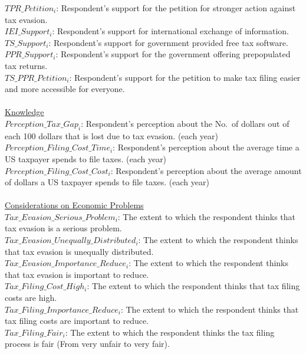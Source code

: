 \documentclass[11pt]{article}
\begin{document}
$TPR\_Petition_i$: Respondent's support for the petition for stronger action against tax evasion. \\[0.15em]
$IEI\_Support_i$: Respondent's support for international exchange of information. \\[0.15em]
$TS\_Support_i$:  Respondent's support for government provided free tax software. \\[0.15em]
$PPR\_Support_i$: Respondent's support for the government offering prepopulated tax returns. \\[0.15em]
$TS\_PPR\_Petition_i$: Respondent's support for the petition to make tax filing easier and more accessible for everyone.\\[0.15em]
\\[0.15em]
\underline{Knowledge} \\[0.15em]
$Perception\_Tax\_Gap_i$: Respondent's perception about the No.\ of dollars out of each 100 dollars that is lost due to tax evasion. (each year) \\[0.15em]
$Perception\_Filing\_Cost\_Time_i$: Respondent's perception about the average time a US taxpayer spends to file taxes. (each year) \\[0.15em]
$Perception\_Filing\_Cost\_Cost_i$: Respondent's perception about the average amount of dollars a US taxpayer spends to file taxes. (each year) \\[0.15em]
\\[0.15em]
\underline{Considerations on Economic Problems} \\[0.15em]
$Tax\_Evasion\_Serious\_Problem_i$: The extent to which the respondent thinks that tax evasion is a serious problem. \\[0.15em]
$Tax\_Evasion\_Unequally\_Distributed_i$: The extent to which the respondent thinks that tax evasion is unequally distributed. \\[0.15em]
$Tax\_Evasion\_Importance\_Reduce_i$: The extent to which the respondent thinks that tax evasion is important to reduce.\\[0.15em]
$Tax\_Filing\_Cost\_High_i$: The extent to which the respondent thinks that tax filing costs are high.\\[0.15em]
$Tax\_Filing\_Importance\_Reduce_i$: The extent to which the respondent thinks that tax filing costs are important to reduce.\\[0.15em]
$Tax\_Filing\_Fair_i$: The extent to which the respondent thinks the tax filing process is fair (From very unfair to very fair).\\[0.15em]
\end{document}
